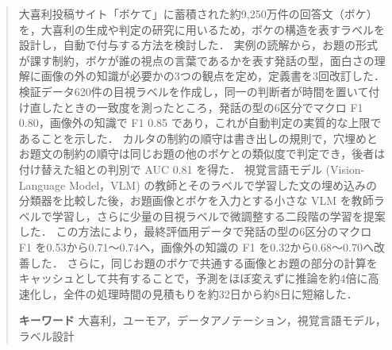 \begin{abstract}
大喜利投稿サイト「ボケて」に蓄積された約9,250万件の回答文（ボケ）を，大喜利の生成や判定の研究に用いるため，ボケの構造を表すラベルを設計し，自動で付与する方法を検討した．
実例の読解から，お題の形式が課す制約，ボケが誰の視点の言葉であるかを表す発話の型，面白さの理解に画像の外の知識が必要かの3つの観点を定め，定義書を3回改訂した．
検証データ620件の目視ラベルを作成し，同一の判断者が時間を置いて付け直したときの一致度を測ったところ，発話の型の6区分でマクロ F1 0.80，画像外の知識で F1 0.85 であり，これが自動判定の実質的な上限であることを示した．
カルタの制約の順守は書き出しの規則で，穴埋めとお題文の制約の順守は同じお題の他のボケとの類似度で判定でき，後者は付け替えた組との判別で AUC 0.81 を得た．
視覚言語モデル (Vision-Language Model，VLM) の教師とそのラベルで学習した文の埋め込みの分類器を比較した後，お題画像とボケを入力とする小さな VLM を教師ラベルで学習し，さらに少量の目視ラベルで微調整する二段階の学習を提案した．
この方法により，最終評価用データで発話の型の6区分のマクロ F1 を0.53から0.71〜0.74へ，画像外の知識の F1 を0.32から0.68〜0.70へ改善した．
さらに，同じお題のボケで共通する画像とお題の部分の計算をキャッシュとして共有することで，予測をほぼ変えずに推論を約4倍に高速化し，全件の処理時間の見積もりを約32日から約8日に短縮した．
\par
\noindent
{\bf キーワード} 大喜利，ユーモア，データアノテーション，視覚言語モデル，ラベル設計
\end{abstract}

